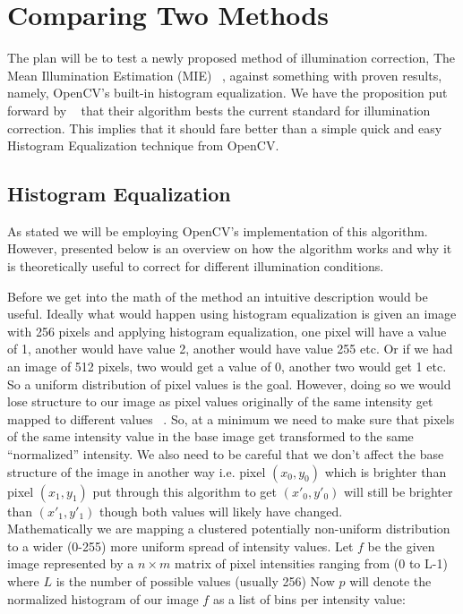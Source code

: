 \section{Comparing Two Methods}
The plan will be to test a newly proposed method of illumination correction, The Mean Illumination Estimation (MIE) 
~\cite{LuoaRINMBoMEfFR}, against something with proven results, namely, OpenCV's built-in histogram equalization.  We 
have the proposition put forward by ~\cite{LuoaRINMBoMEfFR} that their algorithm bests the current standard for 
illumination correction.  This implies that it should fare better than a simple quick and easy Histogram Equalization 
technique from OpenCV.

\subsection{Histogram Equalization}
As stated we will be employing OpenCV's implementation of this algorithm.  However, presented below is an overview on 
how the algorithm works and why it is theoretically useful to correct for different illumination conditions. \\

\pagebreak

Before we get into the math of the method an intuitive description would be useful.  Ideally what would happen using histogram 
equalization is given an image with 256 pixels and applying histogram equalization, one pixel will have a value of 1, another 
would have value 2, another would have value 255 etc.  Or if we had an image of 512 pixels, two would get a value of 0, another 
two would get 1 etc.  So a uniform distribution of pixel values is the goal.  However, doing so we would lose structure to our 
image as pixel values originally of the same intensity get mapped to different values ~\cite{urlIntuitiveHistEqualization}.  
So, at a minimum  we need to make sure that pixels of the same intensity value in the base image get transformed to the same 
``normalized'' intensity.  We also need to be careful that we don't affect the base structure of the image in another way i.e. 
pixel $(x_0, y_0)$ which is brighter than pixel $(x_1, y_1)$ put through this algorithm to get $(x'_0, y'_0)$ will still be 
brighter than $(x'_1, y'_1)$ though both values will likely have changed. \\

Mathematically we are mapping a clustered potentially non-uniform distribution to a wider (0-255) more uniform spread of 
intensity values.  Let $f$ be the given image represented by a $n \times m$ matrix of pixel intensities ranging from (0 to L-1) 
where $L$ is the number of possible values (usually 256) Now $p$ will denote the normalized histogram of our image $f$ as a list 
of bins per intensity value:

